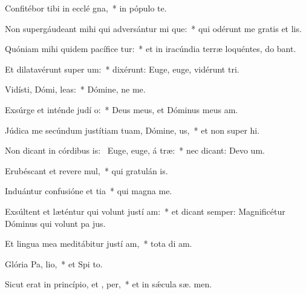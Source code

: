 \item Confitébor tibi in ecclé gna,~* in pópulo   te.
\item Non supergáudeant mihi qui adversántur mi que:~* qui odérunt me gratis et  lis.
\item Quóniam mihi quidem pacífice tur:~* et in iracúndia terræ loquéntes, do bant.
\item Et dilatavérunt super   um:~* dixérunt: Euge, euge, vidérunt  tri.
\item Vidísti, Dómi,  leas:~* Dómine, ne   me.
\item Exsúrge et inténde judí o:~* Deus meus, et Dóminus meus   am.
\item Júdica me secúndum justítiam tuam, Dómine,  us,~* et non super hi.
\item Non dicant in córdibus is:~\pscross{} Euge, euge, á træ:~* nec dicant: Devo um.
\item Erubéscant et revere mul,~* qui gratulán  is.
\item Induántur confusióne et tia~* qui magna   me.
\item Exsúltent et læténtur qui volunt justí am:~* et dicant semper: Magnificétur Dóminus qui volunt pa  jus.
\item Et lingua mea meditábitur justí am,~* tota di  am.
\item Glória Pa,  lio,~* et Spi to.
\item Sicut erat in princípio, et ,  per,~* et in sǽcula sæ. men.

